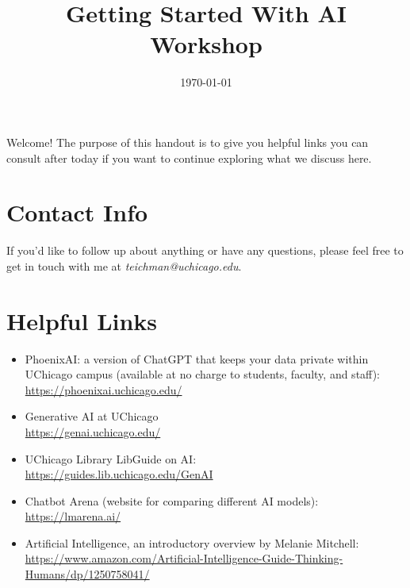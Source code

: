 \documentclass[11pt]{article}
\author{}
\date{\today}
\title{Getting Started With AI Workshop}
\begin{document}
\maketitle
Welcome!  The purpose of this handout is to give you helpful links you
can consult after today if you want to continue exploring what we
discuss here.
\section{Contact Info}
\label{sec:org3c7436b}

If you'd like to follow up about anything or have any questions,
please feel free to get in touch with me at \emph{teichman@uchicago.edu}.
\section{Helpful Links}
\label{sec:org3994ab9}

\begin{itemize}
\item PhoenixAI: a version of ChatGPT that keeps your data private within
UChicago campus (available at no charge to students, faculty, and
staff): \\ \url{https://phoenixai.uchicago.edu/}

\item Generative AI at UChicago \\ \url{https://genai.uchicago.edu/}

\item UChicago Library LibGuide on AI: \\
\url{https://guides.lib.uchicago.edu/GenAI}

\item Chatbot Arena (website for comparing different AI models): \\
\url{https://lmarena.ai/}

\item Artificial Intelligence, an introductory overview by Melanie
Mitchell: \\
\url{https://www.amazon.com/Artificial-Intelligence-Guide-Thinking-Humans/dp/1250758041/}
\end{itemize}
\end{document}
